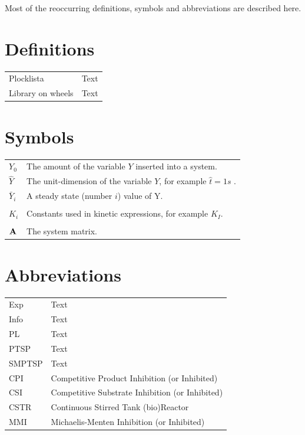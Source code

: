 \documentclass[a4paper, 10pt, twoside, openright]{book}
\begin{document}
Most of the reoccurring definitions, symbols and abbreviations are described here.

\section*{Definitions}
\begin{tabular}{ll}
Plocklista & Text\\
Library on wheels & Text\\
\end{tabular}

\section*{Symbols}

\begin{tabular}{ll}
$Y_0$      & The amount of the variable $Y$ inserted into a system.\\
$\hat Y$& The unit-dimension of the variable $Y$, for example $\hat t=1s$ .\\
$\bar Y_i$ & A steady state (number $i$) value of Y.\\
\phantom{a}& \phantom{b} \\
$K_i$ & Constants used in kinetic expressions, for example $K_I$.\\
\phantom{a}& \phantom{b} \\
$\mathbf{A}$     & The system matrix. \\
\end{tabular}

\section*{Abbreviations}

\begin{tabular}{ll}
Exp		& Text\\
Info	& Text\\
PL		& Text\\
PTSP	& Text\\
SMPTSP	& Text\\




CPI      & Competitive Product Inhibition (or Inhibited)\index{CPI}\\
CSI      & Competitive Substrate Inhibition (or Inhibited)\index{CSI}\\
CSTR     & Continuous Stirred Tank (bio)Reactor\index{CSTR}\\
MMI      & Michaelis-Menten Inhibition (or Inhibited)\index{MMI}
\end{tabular}
\end{document}
